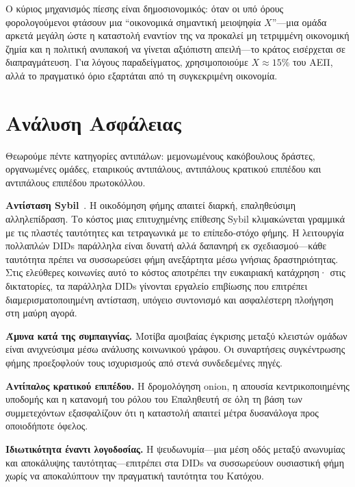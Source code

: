 \documentclass[11pt,a4paper,twocolumn]{article}
\begin{document}
Ο κύριος μηχανισμός πίεσης είναι δημοσιονομικός: όταν οι υπό όρους φορολογούμενοι φτάσουν μια ``οικονομικά σημαντική μειοψηφία $X$''---μια ομάδα αρκετά μεγάλη ώστε η καταστολή εναντίον της να προκαλεί μη τετριμμένη οικονομική ζημία και η πολιτική ανυπακοή να γίνεται αξιόπιστη απειλή---το κράτος εισέρχεται σε διαπραγμάτευση. Για λόγους παραδείγματος, χρησιμοποιούμε $X \approx 15\%$ του ΑΕΠ, αλλά το πραγματικό όριο εξαρτάται από τη συγκεκριμένη οικονομία.

\section{Ανάλυση Ασφάλειας}

Θεωρούμε πέντε κατηγορίες αντιπάλων: μεμονωμένους κακόβουλους δράστες, οργανωμένες ομάδες, εταιρικούς αντιπάλους, αντιπάλους κρατικού επιπέδου και αντιπάλους επιπέδου πρωτοκόλλου.

\textbf{Αντίσταση Sybil}~\cite{douceur2002}. Η οικοδόμηση φήμης απαιτεί διαρκή, επαληθεύσιμη αλληλεπίδραση. Το κόστος μιας επιτυχημένης επίθεσης Sybil κλιμακώνεται γραμμικά με τις πλαστές ταυτότητες και τετραγωνικά με το επίπεδο-στόχο φήμης. Η λειτουργία πολλαπλών DIDs παράλληλα είναι δυνατή αλλά δαπανηρή εκ σχεδιασμού---κάθε ταυτότητα πρέπει να συσσωρεύσει φήμη ανεξάρτητα μέσω γνήσιας δραστηριότητας. Στις ελεύθερες κοινωνίες αυτό το κόστος αποτρέπει την ευκαιριακή κατάχρηση· στις δικτατορίες, τα παράλληλα DIDs γίνονται εργαλείο επιβίωσης που επιτρέπει διαμερισματοποιημένη αντίσταση, υπόγειο συντονισμό και ασφαλέστερη πλοήγηση στη μαύρη αγορά.

\textbf{Άμυνα κατά της συμπαιγνίας.} Μοτίβα αμοιβαίας έγκρισης μεταξύ κλειστών ομάδων είναι ανιχνεύσιμα μέσω ανάλυσης κοινωνικού γράφου. Οι συναρτήσεις συγκέντρωσης φήμης προεξοφλούν τους ισχυρισμούς από στενά συνδεδεμένες πηγές.

\textbf{Αντίπαλος κρατικού επιπέδου.} Η δρομολόγηση onion, η απουσία κεντρικοποιημένης υποδομής και η κατανομή του ρόλου του Επαληθευτή σε όλη τη βάση των συμμετεχόντων εξασφαλίζουν ότι η καταστολή απαιτεί μέτρα δυσανάλογα προς οποιοδήποτε όφελος.

\textbf{Ιδιωτικότητα έναντι λογοδοσίας.} Η ψευδωνυμία---μια μέση οδός μεταξύ ανωνυμίας και αποκάλυψης ταυτότητας---επιτρέπει στα DIDs να συσσωρεύουν ουσιαστική φήμη χωρίς να αποκαλύπτουν την πραγματική ταυτότητα του Κατόχου.
\end{document}
